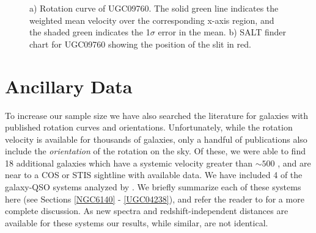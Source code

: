 \begin{figure}[ht]
\centering
  \caption{\small{a) Rotation curve of UGC09760. The solid green line indicates the weighted mean velocity over the corresponding x-axis region, and the shaded green indicates the 1$\sigma$ error in the mean. b) SALT finder chart for UGC09760 showing the position of the slit in red.}}
\vspace{0pt}
\end{figure}



\section{Ancillary Data} \label{ancillary_data}
To increase our sample size we have also searched the literature for galaxies with published rotation curves and orientations. Unfortunately, while the rotation velocity is available for thousands of galaxies, only a handful of publications also include the \emph{orientation} of the rotation on the sky. Of these, we were able to find 18 additional galaxies which have a systemic velocity greater than $\sim 500$ \kms, and are near to a COS or STIS sightline with available data. We have included 4 of the galaxy-QSO systems analyzed by \cite{cote2005}. We briefly summarize each of these systems here (see Sections \ref{NGC6140} - \ref{UGC04238}), and refer the reader to \cite{cote2005} for a more complete discussion. As new spectra and redshift-independent distances are available for these systems our results, while similar, are not identical.




